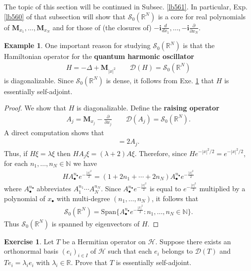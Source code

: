 \documentclass[12pt,b5paper,notitlepage]{article}
\theoremstyle{definition}
\newtheorem{eg}[df]{Example}
\newtheorem{exe}[df]{Exercise}
\theoremstyle{plain}
\newcommand{\Dom}{\mathscr{D}}
\newcommand{\Span}{\mathrm{Span}}
\newcommand{\im}{\mathbf{i}}
\newcommand{\blt}{\bullet}
\newcommand{\Nbb}{\mathbb N}
\newcommand{\Rbb}{\mathbb R}
\newcommand{\MH}{\mathcal H}
\newcommand{\MS}{\mathcal S}
\newcommand{\Mbf}{\mathbf M}
\numberwithin{equation}{section}
\begin{document}
The topic of this section will be continued in Subsec. \ref{lb561}. In particular, Exp. \ref{lb560} of that subsection will show that $\MS_0(\Rbb^N)$ is a core for real polynomials of $\Mbf_{x_1},\dots,\Mbf_{x_N}$ and for those of (the closures of) $-\im\frac{d}{dx_1},\dots,-\im\frac \partial{\partial x_N}$. 

\begin{eg}
One important reason for studying $\MS_0(\Rbb^N)$ is that the Hamiltonian operator for the \textbf{quantum harmonic oscillator}
\begin{align*}
H=-\Delta+\Mbf_{|x|^2}\qquad \Dom(H)=\MS_0(\Rbb^N)
\end{align*}
is diagonalizable. Since $\MS_0(\Rbb^N)$ is dense, it follows from Exe. \ref{lb565} that $H$ is essentially self-adjoint.
\end{eg}

\begin{proof}
We show that $H$ is diagonalizable. Define the \textbf{raising operator}
\begin{align*}
A_j=\Mbf_{x_j}-\frac{\partial}{\partial x_j}\qquad\Dom(A_j)=\MS_0(\Rbb^N).
\end{align*}
A direct computation shows that
\begin{align*}
[H,A_j]=2A_j.
\end{align*}
Thus, if $H\xi=\lambda\xi$ then $HA_j\xi=(\lambda+2)A\xi$. Therefore, since $He^{-|x|^2/2}=e^{-|x|^2/2}$, for each $n_1,\dots,n_N\in\Nbb$ we have
\begin{align*}
HA_\blt^{n_\blt}e^{-\frac{|x|^2}2}=(1+2n_1+\cdots+2n_N)A_\blt^{n_\blt}e^{-\frac{|x|^2}2}
\end{align*}
where $A_\blt^{n_\blt}$ abbreviates $A_1^{n_1}\cdots A_N^{n_N}$. Since $A_\blt^{n_\blt}e^{-\frac{|x|^2}2}$ is equal to $e^{-\frac{|x|^2}2}$ multiplied by a polynomial of $x_\blt$ with multi-degree $(n_1,\dots,n_N)$, it follows that
\begin{align*}
\MS_0(\Rbb^N)=\Span\{A_\blt^{n_\blt}e^{-\frac{|x|^2}2}:n_1,\dots,n_N\in\Nbb\}.
\end{align*}
Thus $\MS_0(\Rbb^N)$ is spanned by eigenvectors of $H$.
\end{proof}

\begin{exe}\label{lb565}
Let $T$ be a Hermitian operator on $\MH$. Suppose there exists an orthonormal basis $(e_i)_{i\in I}$ of $\MH$ such that each $e_i$ belongs to $\Dom(T)$ and $Te_i=\lambda_ie_i$ with $\lambda_i\in\Rbb$. Prove that $T$ is essentially self-adjoint.
\end{exe}
\end{document}
